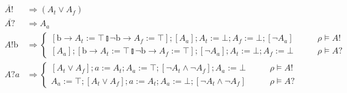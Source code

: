 \documentclass[times, 10pt]{article}
\begin{document}
\begin{align*}
    \overline{A!} & \Rightarrow (A_t \vee A_f) \\
    \overline{A?} & \Rightarrow A_a \\
    A!\mathrm{b} & \Rightarrow \left\{ \begin{matrix} [\mathrm{b} \rightarrow A_t := \top \talloblong \neg \mathrm{b} \rightarrow A_f := \top]; [A_a]; A_t := \bot; A_f := \bot; [\neg A_a] & \qquad \rho \vDash A! \\
                                                      [A_a]; [\mathrm{b} \rightarrow A_t := \top \talloblong \neg \mathrm{b} \rightarrow A_f := \top]; [\neg A_a]; A_t := \bot; A_f := \bot & \qquad \rho \vDash A? \end{matrix} \right. \\
    A?a & \Rightarrow \left\{ \begin{matrix} [A_t \vee A_f]; a := A_t; A_a := \top; [\neg A_t \wedge \neg A_f]; A_a := \bot & \qquad \rho \vDash A! \\
                                             A_a := \top; [A_t \vee A_f]; a := A_t; A_a := \bot; [\neg A_t \wedge \neg A_f] & \qquad \rho \vDash A? \end{matrix} \right.
\end{align*}
\end{document}
